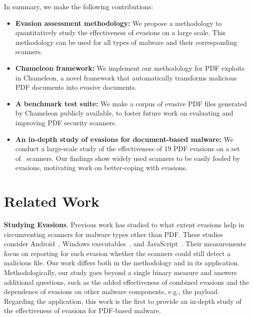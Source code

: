In summary, we make the following contributions:
\begin{itemize}
    \item \textbf{Evasion assessment methodology:} We propose a methodology to quantitatively study the effectiveness of evasions on a large scale. This methodology can be used for all types of malware and their corresponding scanners.
    \item \textbf{Chameleon framework:} We implement our methodology for PDF exploits in Chameleon, a novel framework that automatically transforms malicious PDF documents into evasive documents.
    \item \textbf{A benchmark test suite:} We make a corpus of \nbSamplesSize{} evasive PDF files generated by Chameleon publicly available, to foster future work on evaluating and improving PDF security scanners.
    \item \textbf{An in-depth study of evasions for document-based malware:} We conduct a large-scale study of the effectiveness of 19 PDF evasions on a set of~\nbAnalyzers{} scanners. Our findings show widely used scanners to be easily fooled by evasions, motivating work on better-coping with evasions.
    
\end{itemize}

\section{Related Work}
\label{ss: related work}

\textbf{Studying Evasions}.
Previous work has studied to what extent evasions help in circumventing scanners for malware types other than PDF.
These studies consider Android~\cite{zheng2012adam,faruki2014evaluation,rastogi2013droidchameleon,fedler2013effectiveness,petsas2014rage,canfora2015obfuscation}, Windows executables~\cite{christodorescu2004testing,moser2007limits}, and JavaScript~\cite{Xu2012a}.
Their measurements focus on reporting for each evasion whether the scanners could still detect a malicious file.
Our work differs both in the methodology and in its application.
Methodologically, our study goes beyond a single binary measure and answers additional questions, such as the added effectiveness of combined evasions and the dependence of evasions on other malware components, e.g., the payload.
Regarding the application, this work is the first to provide an in-depth study of the effectiveness of evasions for PDF-based malware.

